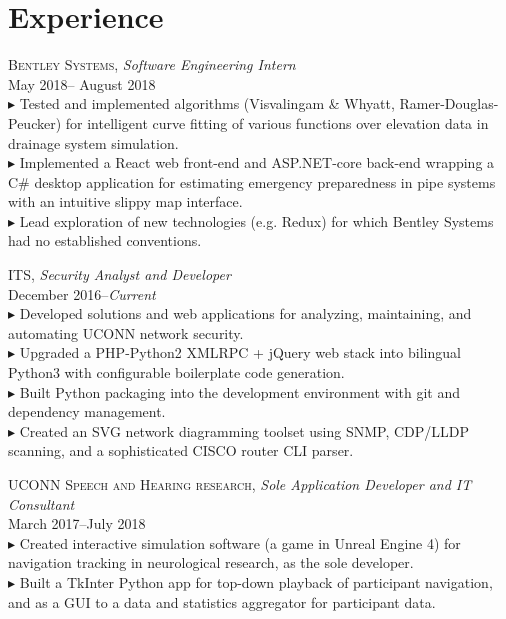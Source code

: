 \documentclass[Letterpaper,11pt]{article}
\newcommand{\bul}{$\blacktriangleright$ }
\begin{document}
\vspace{-1.5em} %
\section*{Experience}
\vspace{0.1em}

    \textsc{Bentley Systems},
    \textit{Software Engineering Intern}\\
    May 2018-- August 2018\\
        \bul Tested and implemented algorithms (Visvalingam \& Whyatt, Ramer-Douglas-Peucker) 
        for intelligent curve fitting of various functions over elevation data in 
        drainage system simulation.
        \\
        \bul Implemented a React web front-end and ASP.NET-core back-end wrapping a C\# desktop 
        application for estimating emergency preparedness in pipe systems with an intuitive 
        slippy map interface.
        \\
        \bul Lead exploration of new technologies (e.g. Redux) for which Bentley Systems
        had no established conventions.

    \textsc{ITS},
    \textit{Security Analyst and Developer}\\
    December 2016--\textit{Current}\\
        \bul Developed solutions and web applications for analyzing, maintaining, and automating UCONN network security.
        \\
        \bul Upgraded a PHP-Python2 XMLRPC + jQuery web stack into bilingual Python3 
        with configurable boilerplate code generation.
        \\
        \bul Built Python packaging into the development environment with git and 
        dependency management.
        \\
        \bul Created an SVG network diagramming toolset using SNMP, CDP/LLDP scanning, 
        and a sophisticated CISCO router CLI parser.

    \textsc{UCONN Speech and Hearing research},
    \textit{Sole Application Developer and IT Consultant}\\
    March 2017--July 2018\\
        \bul Created interactive simulation software (a game in Unreal Engine 4) 
        for navigation tracking in neurological research, as the sole developer.
        \\
        \bul Built a TkInter Python app for top-down playback of participant navigation,
        and as a GUI to a data and statistics aggregator for participant data.
        
\end{document}
